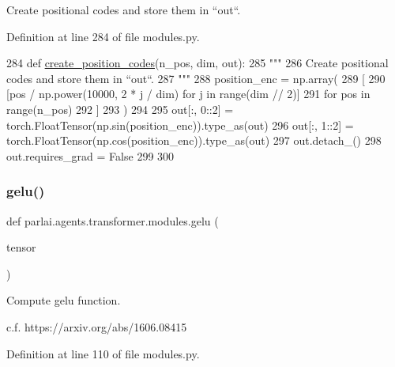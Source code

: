 \begin{DoxyVerb}Create positional codes and store them in ``out``.
\end{DoxyVerb}
 

Definition at line 284 of file modules.\+py.


\begin{DoxyCode}
284 \textcolor{keyword}{def }\hyperlink{namespaceparlai_1_1agents_1_1transformer_1_1modules_a0b86437e6e9682fa3100e9cadcaae259}{create\_position\_codes}(n\_pos, dim, out):
285     \textcolor{stringliteral}{"""}
286 \textcolor{stringliteral}{    Create positional codes and store them in ``out``.}
287 \textcolor{stringliteral}{    """}
288     position\_enc = np.array(
289         [
290             [pos / np.power(10000, 2 * j / dim) \textcolor{keywordflow}{for} j \textcolor{keywordflow}{in} range(dim // 2)]
291             \textcolor{keywordflow}{for} pos \textcolor{keywordflow}{in} range(n\_pos)
292         ]
293     )
294 
295     out[:, 0::2] = torch.FloatTensor(np.sin(position\_enc)).type\_as(out)
296     out[:, 1::2] = torch.FloatTensor(np.cos(position\_enc)).type\_as(out)
297     out.detach\_()
298     out.requires\_grad = \textcolor{keyword}{False}
299 
300 
\end{DoxyCode}
\mbox{\label{namespaceparlai_1_1agents_1_1transformer_1_1modules_ad93916b8d2188c35733089e1581c44f8}} 
\subsubsection{\texorpdfstring{gelu()}{gelu()}}
{\footnotesize\ttfamily def parlai.\+agents.\+transformer.\+modules.\+gelu (\begin{DoxyParamCaption}\item[{}]{tensor }\end{DoxyParamCaption})}

\begin{DoxyVerb}Compute gelu function.

c.f. https://arxiv.org/abs/1606.08415
\end{DoxyVerb}
 

Definition at line 110 of file modules.\+py.


